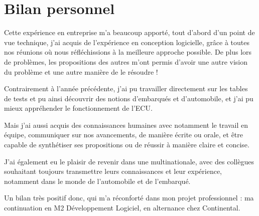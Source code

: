 \newpage
\section{Bilan personnel}
Cette expérience en entreprise m'a beaucoup apporté, tout d'abord d'un point de vue technique, j'ai acquis de l'expérience en conception logicielle, grâce
à toutes nos réunions où nous réfléchissions à la meilleure approche possible. De plus lors de problèmes, les propositions des autres m'ont permis d'avoir
une autre vision du problème et une autre manière de le résoudre !

Contrairement à l'année précédente, j'ai pu travailler directement sur les tables de tests et pu ainsi découvrir des notions d'embarqués et d'automobile, et j'ai pu mieux appréhender le fonctionnement de l'ECU. 

Mais j'ai aussi acquis des connaissances humaines avec notamment le travail en équipe, communiquer sur nos avancements, de manière écrite ou orale, et être capable de synthétiser ses
propositions ou de réussir à manière claire et concise.

J'ai également eu le plaisir de revenir dans une multinationale, avec des collègues souhaitant toujours transmettre leurs connaissances et leur expérience, notamment dans le monde de l'automobile et de l'embarqué. 

Un bilan très positif donc, qui m'a réconforté dans mon projet professionnel : ma continuation en M2 Développement Logiciel, en alternance chez Continental.
